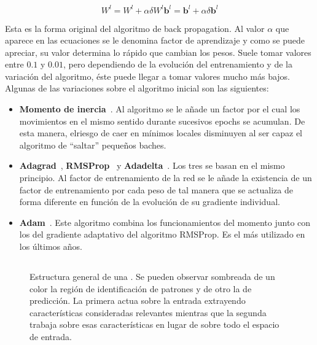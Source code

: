 \begin{subequations}
	\begin{equation}
		W^l = W^l + \alpha \delta W^l \label{eq:error-applied-to-weights}
	\end{equation}
	\begin{equation}
		\mathbf{b}^l = \mathbf{b}^l + \alpha \delta \mathbf{b}^l \label{eq:error-applied-to-bias}
	\end{equation}
\end{subequations}

Esta es la forma original del algoritmo de back propagation. Al valor $\alpha$ que aparece en las ecuaciones se le denomina factor de aprendizaje y como se puede apreciar, su valor determina lo rápido que cambian los pesos. Suele tomar valores entre $0.1$ y $0.01$, pero dependiendo de la evolución del entrenamiento y de la variación del algoritmo, éste puede llegar a tomar valores mucho más bajos. Algunas de las variaciones sobre el algoritmo inicial son las siguientes:

\begin{itemize}
	\item \textbf{Momento de inercia}~\cite{qian1999momentum}. Al algoritmo se le añade un factor por el cual los movimientos en el mismo sentido durante sucesivos epochs se acumulan. De esta manera, elriesgo de caer en mínimos locales disminuyen al ser capaz el algoritmo de \enquote{saltar} pequeños baches.
	\item \textbf{Adagrad}~\cite{duchi2011adaptive}, \textbf{RMSProp}~\cite{tieleman2012lecture} y \textbf{Adadelta}~\cite{zeiler2012adadelta}. Los tres se basan en el mismo principio. Al factor de entrenamiento de la red se le añade la existencia de un factor de entrenamiento por cada peso de tal manera que se actualiza de forma diferente en función de la evolución de su gradiente individual.
	\item \textbf{Adam}~\cite{kingma2014adam}. Este algoritmo combina los funcionamientos del momento junto con los del gradiente adaptativo del algoritmo RMSProp. Es el más utilizado en los últimos años.
\end{itemize}

\subsection{}

\begin{figure}[!b]
	\caption[Estructura general de una ]{Estructura general de una . Se pueden observar sombreada de un color la región de identificación de patrones y de otro la de predicción. La primera actua sobre la entrada extrayendo características consideradas relevantes mientras que la segunda trabaja sobre esas características en lugar de sobre todo el espacio de entrada.}
	\label{fig:cnn-general-structure}
\end{figure}

